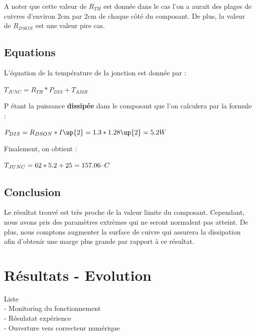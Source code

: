 \documentclass[11pt, french]{article} %
\begin{document}
\noindent
A noter que cette valeur de $R_{TH}$ est donnée dans le cas l'on a aurait des plages de cuivres d'environ 2cm par 2cm de chaque côté du composant. De plus, la valeur de $R_{DSON}$ est une valeur pire cas.

\subsection{Equations}

\noindent
L'équation de la température de la jonction est donnée par :

\vspace{0.5cm}

\noindent
$
T_{JUNC} = R_{TH} * P_{DIS} + T_{AMB}
$

\vspace{0.5cm}

\noindent
P étant la puissance \textbf{dissipée} dans le composant que l'on calculera par la formule :

\vspace{0.5cm}

\noindent
$
P_{DIS} = R_{DSON} * I\up{2} = 1.3 * 1.28\up{2} = 5.2 W
$

\vspace{0.5cm}

\noindent
Finalement, on obtient :

\vspace{0.5cm}

\noindent
$
T_{JUNC} = 62 * 5.2 + 25 = 157.06 \char123C
$

\subsection{Conclusion}

\noindent
Le résultat trouvé est très proche de la valeur limite du composant. Cependant, nous avons pris des paramètres extrèmes qui ne seront normalent pas atteint. De plus, nous comptons augmenter la surface de cuivre qui assurera la dissipation afin d'obtenir une marge plus grande par rapport à ce résultat.

\section{Résultats - Evolution}
Liste
\\- Monitoring du fonctionnement
\\- Résulatat expérience
\\- Ouverture vers correcteur numérique
\end{document}
